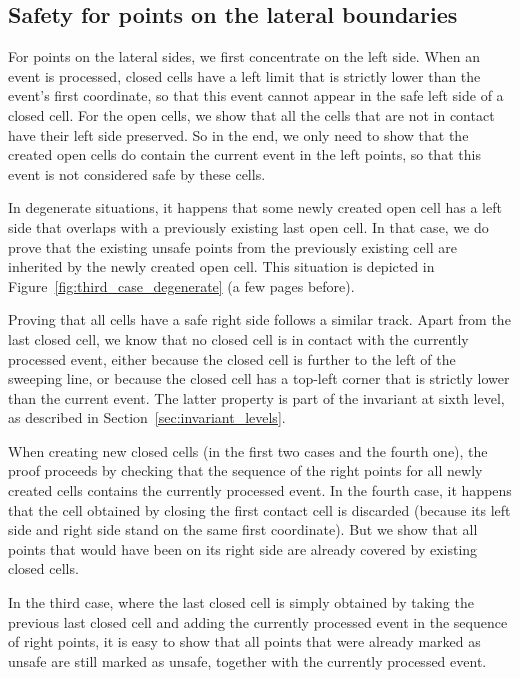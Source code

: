 \documentclass[a4paper, USenglish, cleveref, autoref, thm-restate, final]{lipics-v2021}
\begin{document}
\subsection{Safety for points on the lateral boundaries}
For points on the lateral sides, we first concentrate on the left side.
When an event is processed, closed cells have a left limit that is
strictly lower than the event's first coordinate, so that this event cannot appear
in the safe left side of a closed cell.  For the open cells, we show
that all the cells that are not in contact have their left side preserved.
So in the end, we only need to show that the created open cells do contain
the current event in the left points, so that this event is not considered
safe by these cells.

In degenerate situations, it happens that some newly created
open cell has a left side that overlaps with a previously
existing last open cell.  In that case, we do prove that the existing
unsafe points from the previously existing cell are inherited by the newly
created open cell.  This situation is depicted in
Figure~\ref{fig:third_case_degenerate} (a few pages before).

Proving that all cells have a safe right side follows a similar track.
Apart from the last closed cell, we know that no closed cell is in contact
with the currently processed event, either because the closed cell is
further to the left of the sweeping line, or because the closed cell has
a top-left corner that is strictly lower than the current event.  The
latter property is part of the invariant at sixth level, as described
in Section~\ref{sec:invariant_levels}.

When creating new closed cells (in the first two cases and the fourth one),
the proof proceeds by checking that the sequence of the right points
for all newly created cells contains the currently processed event.
In the fourth case, it happens that the cell obtained by closing the
first contact cell is discarded (because its left side and right side
stand on the same first coordinate).  But we show that all points
that would have been on its right side are already covered by existing closed
cells.

In the third case, where the last closed cell is simply obtained by
taking the previous last closed cell and adding the currently processed event
in the sequence of right points, it is easy to show that all points
that were already marked as unsafe are still marked as unsafe, together with
the currently processed event.
\end{document}
